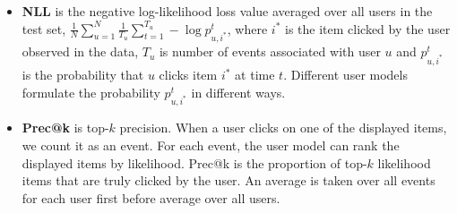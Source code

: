 \documentclass{article} %
\begin{document}
\begin{itemize}[noitemsep,nolistsep,leftmargin=*]
\item {\bf NLL} is the negative log-likelihood loss value averaged over all users in the test set, $\frac{1}{N}\sum_{u=1}^{N}\frac{1}{T_u}\sum_{t=1}^{T_u} -\log p_{u,i^*}^t$, where $i^*$ is the item clicked by the user observed in the data, $T_u$ is number of events associated with user $u$ and $p_{u,i^*}^t$ is the probability that $u$ clicks item $i^*$ at time $t$. Different user models formulate the probability $p_{u,i^*}^t$ in different ways.

\item {\bf Prec@k} is top-$k$ precision. When a user clicks on one of the displayed items, we count it as an event. For each event, the user model can rank the displayed items by likelihood. Prec@k is the proportion of top-$k$ likelihood items that are truly clicked by the user. An average is taken over all events for each user first before average over all users.

\end{itemize}
\begin{table}[ht!]
\vspace{-1mm}
\caption{\small Predictive performance evaluation: loss and precision of LR, CCF and GAN models assessed on a test set of 25,000 users for the news article dataset and 500 users for MovieLens dataset.}
\label{tb:user_model}
\vspace{-3mm}
\begin{center}
\end{center}
\vspace{-3mm}
\end{table}
\end{document}

